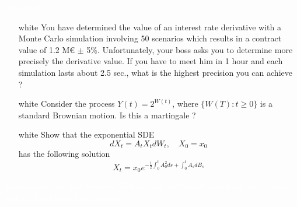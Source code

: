 \documentclass{beamer}
\begin{document}
\begin{homework}
\begin{frame}{\textcolor{white}{Homework}}
\begin{itemize}
\item[white]  You have determined the value of an interest rate derivative with a Monte Carlo simulation involving 50 scenarios which results in a contract value of 1.2 M€ $\pm$ 5\%. Unfortunately, your boss asks you to determine more precisely the derivative value. If you have to meet him in 1 hour and each simulation lasts about 2.5 sec., what is the highest precision you can achieve ?
\item[white] Consider the process $Y(t) = 2^{W(t)}$, where $\{W(T):t\geq 0\}$ is a standard Brownian motion. Is this a martingale ?
\item[white]  Show that the exponential SDE
\begin{equation*}
dX_t = A_t X_tdW_t,\quad X_0=x_0
\end{equation*}
has the following solution
\begin{equation*}
X_t = x_0 e^{-\frac{1}{2}\int_0^t A_0^2 ds+\int_0^t A_s dB_s}
\end{equation*}
\end{itemize}
\textcolor{white}{Exercises for this part involves: SDE solving, martingale definition, Ito's lemma, and a bit of Monte Carlo theory.}
\end{frame}
\end{homework}
\end{document}
